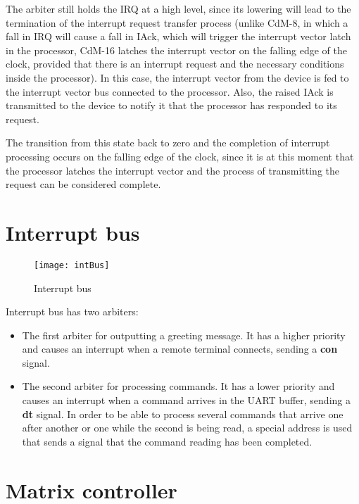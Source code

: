 \begin{enumerate}
		The arbiter still holds the IRQ at a high level, since its lowering will lead to the termination of the interrupt request transfer process (unlike CdM-8, in which a fall in IRQ will cause a fall in IAck, which will trigger the interrupt vector latch in the processor, CdM-16 latches the interrupt vector on the falling edge of the clock, provided that there is an interrupt request and the necessary conditions inside the processor). In this case, the interrupt vector from the device is fed to the interrupt vector bus connected to the processor. Also, the raised IAck is transmitted to the device to notify it that the processor has responded to its request.

		The transition from this state back to zero and the completion of interrupt processing occurs on the falling edge of the clock, since it is at this moment that the processor latches the interrupt vector and the process of transmitting the request can be considered complete.
\end{enumerate}

\section*{Interrupt bus}

\begin{figure}[ht]
	\centering
	\texttt{[image: intBus]}
	\caption{Interrupt bus}
\end{figure}

Interrupt bus has two arbiters:

\begin{itemize}
	\item The first arbiter for outputting a greeting message. It has a higher priority and causes an interrupt when a remote terminal connects, sending a \textbf{con} signal.
	\item The second arbiter for processing commands. It has a lower priority and causes an interrupt when a command arrives in the UART buffer, sending a \textbf{dt} signal. In order to be able to process several commands that arrive one after another or one while the second is being read, a special address is used that sends a signal that the command reading has been completed.
\end{itemize}

\section*{Matrix controller}

